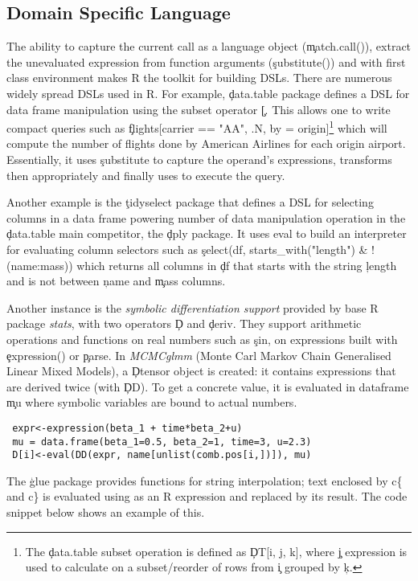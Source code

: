 \documentclass[review,screen,acmsmall]{acmart}
\begin{document}
\subsection{Domain Specific Language}

The ability to capture the current call as a language object (\c{match.call()}),
extract the unevaluated expression from function arguments (\c{substitute()})
and \eval with first class environment makes R the toolkit for building DSLs.
There are numerous widely spread DSLs used in R. For example, \c{data.table}
package defines a DSL for data frame manipulation using the subset operator
\c{[}. This allows one to write compact queries such as \c{flights[carrier ==
  "AA", .N, by = origin]}\footnote{The \c{data.table} subset operation is
  defined as \c{DT[i, j, k]}, where \c{j} expression is used to calculate on a
  subset/reorder of rows from \c{i} grouped by \c{k}.} which will compute the
number of flights done by American Airlines for each origin airport.
Essentially, it uses \c{substitute} to capture the operand's expressions,
transforms then appropriately and finally uses \eval to execute the query.

Another example is the \c{tidyselect} package that defines a DSL for selecting
columns in a data frame powering number of data manipulation operation in the
\c{data.table} main competitor, the \c{dply} package. It uses eval to build an
interpreter for evaluating column selectors such as \c{select(df,
starts\_with("length") \& !(name:mass))} which returns all columns in \c{df}
that starts with the string \c{length} and is not between \c{name} and
\c{mass} columns.


Another instance is the \emph{symbolic differentiation support} provided by base R package \emph{stats}, with two operators \c{D} and \c{deriv}. They support arithmetic operations and functions on real numbers such as \c{sin}, on expressions built with \c{expression()} or \c{parse}.
In \emph{MCMCglmm} (Monte Carl Markov Chain Generalised Linear Mixed Models), a \c{Dtensor} object is created: it contains expressions that are derived twice (with \c{DD}). To get a concrete value, it is evaluated in  dataframe \c{mu} where symbolic variables are bound to actual numbers.
\begin{lstlisting}
 expr<-expression(beta_1 + time*beta_2+u)
 mu = data.frame(beta_1=0.5, beta_2=1, time=3, u=2.3)
 D[i]<-eval(DD(expr, name[unlist(comb.pos[i,])]), mu)
\end{lstlisting}

The \c{glue} package provides functions for string interpolation; text enclosed
by c{\{} and c{\}} is evaluated using \eval as an R expression and replaced by
its result. The code snippet below shows an example of this.
\end{document}
